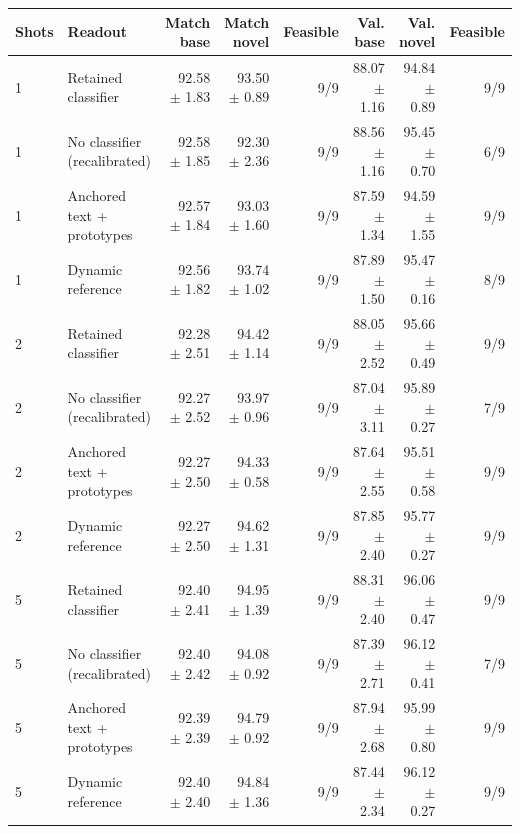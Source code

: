 \begin{tabular}{llrrrrrr}
\toprule
Shots & Readout & Match base & Match novel & Feasible & Val. base & Val. novel & Feasible \\
\midrule
1 & Retained classifier & 92.58 $\pm$ 1.83 & 93.50 $\pm$ 0.89 & 9/9 & 88.07 $\pm$ 1.16 & 94.84 $\pm$ 0.89 & 9/9 \\
1 & No classifier (recalibrated) & 92.58 $\pm$ 1.85 & 92.30 $\pm$ 2.36 & 9/9 & 88.56 $\pm$ 1.16 & 95.45 $\pm$ 0.70 & 6/9 \\
1 & Anchored text + prototypes & 92.57 $\pm$ 1.84 & 93.03 $\pm$ 1.60 & 9/9 & 87.59 $\pm$ 1.34 & 94.59 $\pm$ 1.55 & 9/9 \\
1 & Dynamic reference & 92.56 $\pm$ 1.82 & 93.74 $\pm$ 1.02 & 9/9 & 87.89 $\pm$ 1.50 & 95.47 $\pm$ 0.16 & 8/9 \\
\midrule
2 & Retained classifier & 92.28 $\pm$ 2.51 & 94.42 $\pm$ 1.14 & 9/9 & 88.05 $\pm$ 2.52 & 95.66 $\pm$ 0.49 & 9/9 \\
2 & No classifier (recalibrated) & 92.27 $\pm$ 2.52 & 93.97 $\pm$ 0.96 & 9/9 & 87.04 $\pm$ 3.11 & 95.89 $\pm$ 0.27 & 7/9 \\
2 & Anchored text + prototypes & 92.27 $\pm$ 2.50 & 94.33 $\pm$ 0.58 & 9/9 & 87.64 $\pm$ 2.55 & 95.51 $\pm$ 0.58 & 9/9 \\
2 & Dynamic reference & 92.27 $\pm$ 2.50 & 94.62 $\pm$ 1.31 & 9/9 & 87.85 $\pm$ 2.40 & 95.77 $\pm$ 0.27 & 9/9 \\
\midrule
5 & Retained classifier & 92.40 $\pm$ 2.41 & 94.95 $\pm$ 1.39 & 9/9 & 88.31 $\pm$ 2.40 & 96.06 $\pm$ 0.47 & 9/9 \\
5 & No classifier (recalibrated) & 92.40 $\pm$ 2.42 & 94.08 $\pm$ 0.92 & 9/9 & 87.39 $\pm$ 2.71 & 96.12 $\pm$ 0.41 & 7/9 \\
5 & Anchored text + prototypes & 92.39 $\pm$ 2.39 & 94.79 $\pm$ 0.92 & 9/9 & 87.94 $\pm$ 2.68 & 95.99 $\pm$ 0.80 & 9/9 \\
5 & Dynamic reference & 92.40 $\pm$ 2.40 & 94.84 $\pm$ 1.36 & 9/9 & 87.44 $\pm$ 2.34 & 96.12 $\pm$ 0.27 & 9/9 \\
\bottomrule
\end{tabular}
